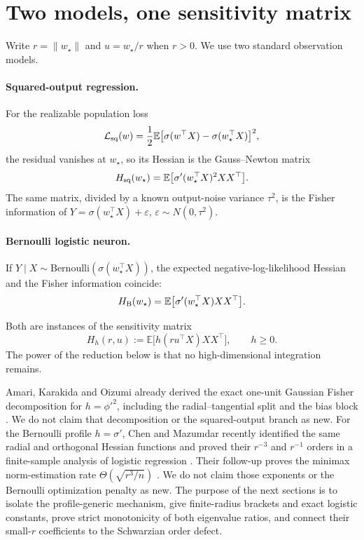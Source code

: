 \documentclass[11pt]{article}
\newcommand{\E}{\mathbb E}
\begin{document}
\section{Two models, one sensitivity matrix}

Write $r=\lVert w_\star\rVert$ and $u=w_\star/r$ when $r>0$.  We use two standard observation models.

\paragraph{Squared-output regression.}
For the realizable population loss
\begin{equation}
 \mathcal L_{\rm sq}(w)=\frac12\E\bigl[\sigma(w^\top X)-\sigma(w_\star^\top X)\bigr]^2,
 \label{eq:squareloss}
\end{equation}
the residual vanishes at $w_\star$, so its Hessian is the Gauss--Newton matrix
\begin{equation}
 H_{\rm sq}(w_\star)=\E\bigl[\sigma'(w_\star^\top X)^2XX^\top\bigr].
 \label{eq:squarehess}
\end{equation}
The same matrix, divided by a known output-noise variance $\tau^2$, is the Fisher information of
$Y=\sigma(w_\star^\top X)+\varepsilon$, $\varepsilon\sim N(0,\tau^2)$.

\paragraph{Bernoulli logistic neuron.}
If $Y\mid X\sim\mathrm{Bernoulli}(\sigma(w_\star^\top X))$, the expected negative-log-likelihood Hessian and the
Fisher information coincide:
\begin{equation}
 H_{\rm B}(w_\star)=\E\bigl[\sigma'(w_\star^\top X)XX^\top\bigr].
 \label{eq:bernhess}
\end{equation}

Both are instances of the sensitivity matrix
\begin{equation}
 H_h(r,u):=\E\bigl[h(r u^\top X)XX^\top\bigr], \qquad h\ge0.
 \label{eq:profilematrix}
\end{equation}
The power of the reduction below is that no high-dimensional integration remains.

Amari, Karakida and Oizumi already derived the exact one-unit Gaussian Fisher decomposition for
$h=\phi'^2$, including the radial--tangential split and the bias block \cite{amari2019}.  We do not claim that
decomposition or the squared-output branch as new.
For the Bernoulli profile $h=\sigma'$, Chen and Mazumdar recently identified the same radial and orthogonal
Hessian functions and proved their $r^{-3}$ and $r^{-1}$ orders in a finite-sample analysis of logistic regression
\cite{chen2026gd}.  Their follow-up proves the minimax norm-estimation rate $\Theta(\sqrt{r^3/n})$
\cite{chen2026minimax}.  We do not claim those exponents or the Bernoulli optimization penalty as new.  The
purpose of the next sections is to isolate the profile-generic mechanism, give finite-radius brackets and exact
logistic constants, prove strict monotonicity of both eigenvalue ratios, and connect their small-$r$ coefficients to
the Schwarzian order defect.
\end{document}
